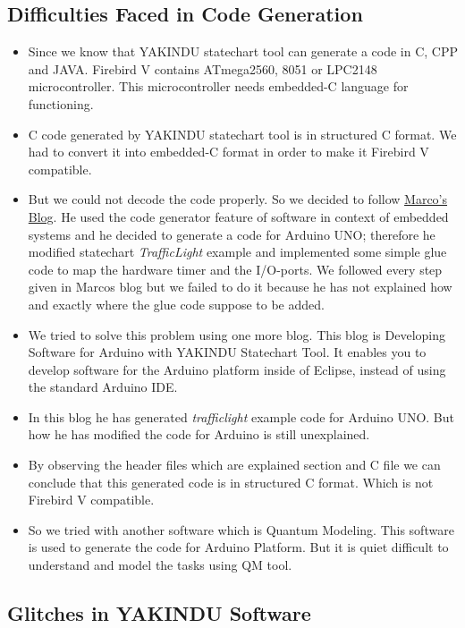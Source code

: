 \documentclass[a4paper,12pt,oneside]{article}
\begin{document}
\subsection{Difficulties Faced in Code Generation}
\begin{itemize}
\item Since we know that YAKINDU statechart tool can generate a code in C, CPP and JAVA. Firebird V contains ATmega2560, 8051 or LPC2148 microcontroller. This microcontroller needs embedded-C language for functioning.
\item C code generated by YAKINDU statechart tool is in structured C format. We had to convert it into embedded-C format in order to make it Firebird V compatible.
\item But we could not decode the code properly. So we decided to follow  \href{http://scholtyssek.org/blog/2013/10/21/yakindu-statechart-tools-arduino-integration/}{Marco's Blog}. He used the code generator feature of software in context of embedded systems and he decided to generate a code for Arduino UNO; therefore he modified statechart \emph{TrafficLight} example and implemented some simple glue code to map the hardware timer and the I/O-ports. We followed every step given in Marco\textquotesingle s blog but we failed to do it because he has not explained how and exactly where the glue code suppose to be added.
\item We tried to solve this problem using one more blog. This blog is Developing Software for Arduino with YAKINDU Statechart Tool. It enables you to develop software for the Arduino platform inside of Eclipse, instead of using the standard Arduino IDE.
\item In this blog he has generated  \emph{trafficlight} example code for  Arduino UNO. But how he has modified the code for Arduino is still unexplained.
\item By observing the  header files which are explained section and C file we can conclude that this generated code is in structured C format. Which is not Firebird V compatible. 
\item So we tried with another software which is Quantum Modeling. This software is used to generate the code for Arduino Platform. But it is quiet difficult to understand and model the tasks using QM tool.
\end{itemize}
\subsection{Glitches in YAKINDU Software}
\end{document}
